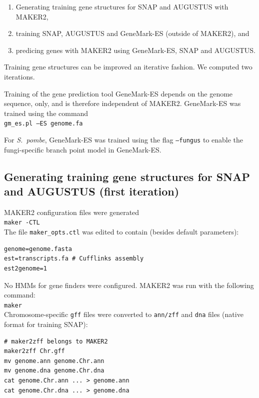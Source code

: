 \documentclass[a4paper,10pt]{report}
\begin{document}
\begin{enumerate}
 \item Generating training gene structures for SNAP and AUGUSTUS with MAKER2,
 \item training SNAP, AUGUSTUS and GeneMark-ES (outside of MAKER2), and
 \item predicing genes with MAKER2 using GeneMark-ES, SNAP and AUGUSTUS.
\end{enumerate}

\noindent Training gene structures can be improved an iterative fashion. We computed two iterations.

Training of the gene prediction tool GeneMark-ES depends on the genome sequence, only, and is therefore independent of MAKER2. GeneMark-ES was trained using the command\\

\noindent \texttt{gm\_es.pl --ES genome.fa}

\noindent For \textit{S.~pombe}, GeneMark-ES was trained using the flag \texttt{--fungus} to enable the fungi-specific branch point model in GeneMark-ES.

\subsection{Generating training gene structures for SNAP and AUGUSTUS (first iteration)} \label{training_genes_it1}

MAKER2 configuration files were generated\\

\noindent \texttt{maker -CTL}\\

\noindent The file \texttt{maker\_opts.ctl} was edited to contain (besides default parameters):

\begin{verbatim}
genome=genome.fasta
est=transcripts.fa # Cufflinks assembly
est2genome=1
\end{verbatim}

\noindent No HMMs for gene finders were configured. MAKER2 was run with the following command:\\

\noindent \texttt{maker}\\

\noindent Chromosome-specific \texttt{gff} files were converted to \texttt{ann/zff} and \texttt{dna} files (native format for training SNAP):

\begin{verbatim}
# maker2zff belongs to MAKER2
maker2zff Chr.gff
mv genome.ann genome.Chr.ann
mv genome.dna genome.Chr.dna
cat genome.Chr.ann ... > genome.ann
cat genome.Chr.dna ... > genome.dna
\end{verbatim}
\end{document}
